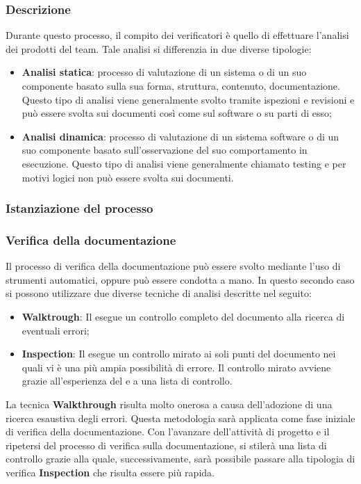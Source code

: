 \subsubsection{Descrizione}
Durante questo processo, il compito dei verificatori è quello di effettuare l'analisi dei prodotti del team. Tale analisi si differenzia in due diverse tipologie:
\begin{itemize}
    \item \textbf{Analisi statica}: processo di valutazione di un sistema o di un suo componente basato sulla sua forma, struttura, contenuto, documentazione. Questo tipo di analisi viene generalmente svolto tramite ispezioni e revisioni e può essere svolta sui documenti così come sul software o su parti di esso;
    \item \textbf{Analisi dinamica}: processo di valutazione di un sistema software o di un suo componente basato sull'osservazione del suo comportamento in esecuzione. Questo tipo di analisi viene generalmente chiamato testing e per motivi logici non può essere svolta sui documenti.
\end{itemize}
\subsubsection{Istanziazione del processo}
\subsubsection{Verifica della documentazione}
Il processo di verifica della documentazione può essere svolto mediante l'uso di strumenti automatici, oppure può essere condotta a mano. In questo secondo caso si possono utilizzare due diverse tecniche di analisi descritte nel seguito:
\begin{itemize}
    \item \textbf{Walktrough}: Il \roleVerifierLow{} esegue un controllo completo del documento alla ricerca di eventuali errori;
    \item \textbf{Inspection}: Il \roleVerifierLow{} esegue un controllo mirato ai soli punti del documento nei quali vi è una più ampia possibilità di errore. Il controllo mirato avviene grazie all'esperienza del \roleVerifierLow{} e a una lista di controllo\glo{}.
\end{itemize}
La tecnica \textbf{Walkthrough} risulta molto onerosa a causa dell'adozione di una ricerca esaustiva degli errori. Questa metodologia sarà applicata come fase iniziale di verifica della documentazione. Con l'avanzare dell'attività di progetto e il ripetersi del processo di verifica sulla documentazione, si stilerà una lista di controllo\glo{} grazie alla quale, successivamente, sarà possibile passare alla tipologia di verifica \textbf{Inspection} che risulta essere più rapida.

